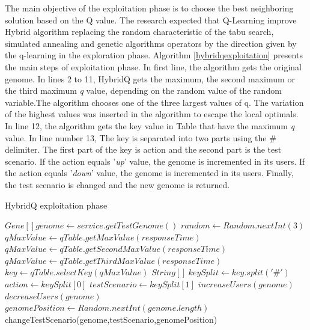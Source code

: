 \documentclass[espaco=umemeio,chapter=TITLE,twoside,openright]{abnt}
\begin{document}
The main objective of the exploitation phase is to choose the best neighboring solution based on the Q value. The research expected that Q-Learning improve Hybrid algorithm replacing the random characteristic of the tabu search, simulated  annealing and genetic algorithms operators by the direction given by the q-learning in the exploration phase. Algorithm \ref{hybridqexploitation} presents the main steps of exploitation phase. In first line, the algorithm gets the original genome. In lines 2 to 11, HybridQ gets the maximum, the second maximum or the third maximum \textit{q} value, depending on the random value of the random variable.The algorithm chooses one of the three largest values of q. The variation of the highest values was inserted in the algorithm to escape the local optimals. In line 12, the algorithm gets the key value in Table that have the maximum \textit{q} value. In line number 13, The key is separated into two parts using the \# delimiter. The first part of the key is action and the second part is the test scenario. If the action equals '\textit{up}' value, the genome is incremented in its users. If the action equals '\textit{down}' value, the genome is incremented in its users. Finally, the test scenario is changed and the new genome is returned.




\begin{algorithm}[h]
  \caption{HybridQ exploitation phase }\label{hybridqexploitation}
  \begin{algorithmic}[1]    
    \State $Gene[] genome \gets service.getTestGenome()$
    \State $random \gets Random.nextInt(3)$
    \State $qMaxValue \gets qTable.getMaxValue(responseTime)$
    \EndIf
    \State $qMaxValue \gets qTable.getSecondMaxValue(responseTime)$
    \EndIf
    \State $qMaxValue \gets qTable.getThirdMaxValue(responseTime)$
    \EndIf
    \State $key \gets qTable.selectKey(qMaxValue)$
    \State $String[]\  keySplit \gets key.split('\#')$ 
    \State $action \gets keySplit[0]$
    \State $testScenario \gets keySplit[1]$   
    \State $ increaseUsers(genome) $
    \EndIf
    \State $ decreaseUsers(genome) $
    \EndIf    
    \State $genomePosition \gets Random.nextInt(genome.length)$
    \State changeTestScenario(genome,testScenario,genomePosition)
  \end{algorithmic}
\end{algorithm}
\end{document}
